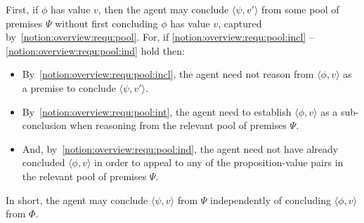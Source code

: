 \begin{note}
  First, if \(\phi\) has value \(v\), then the agent may conclude \(\langle \psi,v' \rangle\) from some pool of premises \(\Psi\) without first concluding \(\phi\) has value \(v\), captured by~\ref{notion:overview:requ:pool}.
  For, if \ref{notion:overview:requ:pool:incl} -- \ref{notion:overview:requ:pool:ind} hold then:
  \begin{itemize}
  \item
    By~\ref{notion:overview:requ:pool:incl}, the agent need not reason from \(\langle \phi,v \rangle\) as a premise to conclude \(\langle \psi,v' \rangle\).
  \item
    By~\ref{notion:overview:requ:pool:int}, the agent need to establish \(\langle \phi,v \rangle\) as a sub-conclusion when reasoning from the relevant pool of premises \(\Psi\).
  \item
    And, by~\ref{notion:overview:requ:pool:ind}, the agent need not have already concluded \(\langle \phi,v \rangle\) in order to appeal to any of the proposition-value pairs in the relevant pool of premises \(\Psi\).
  \end{itemize}
  In short, the agent may conclude \(\langle \psi,v \rangle\) from \(\Psi\) independently of concluding \(\langle \phi,v \rangle\) from \(\Phi\).
\end{note}

